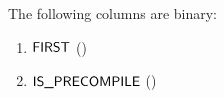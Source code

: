 The following columns are binary:
\begin{multicols}{2}
\begin{enumerate}
	\item $\textsf{FIRST}$        \quad (\trash)
	\item $\textsf{IS\_PRECOMPILE}$ \quad (\trash)
\end{enumerate}
\end{multicols}

